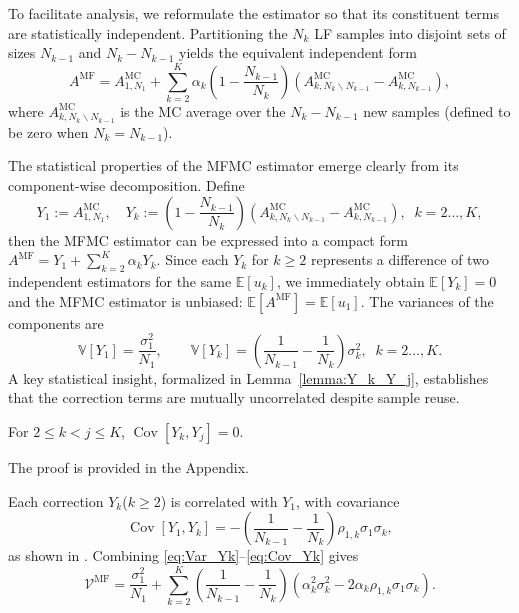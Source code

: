 To facilitate analysis, we reformulate the estimator so that its constituent terms are statistically independent. Partitioning the $N_k$ LF samples into disjoint sets of sizes $N_{k-1}$ and $N_k-N_{k-1}$ yields the equivalent independent form
%
\begin{equation}\label{eq:MFMC_estimator_independent}
    A^{\text{MF}} = A^{\text{MC}}_{1,N_1} +  \sum_{k=2}^K \alpha_k\!\left(1-\frac{N_{k-1}}{N_k}\right)\left(A^{\text{MC}}_{k,N_k\backslash N_{k-1}}-A^{\text{MC}}_{k,N_{k-1}}\right),
\end{equation}
%
where $A_{k,N_k\backslash N_{k-1}}^{\text{MC}}$ is the MC average over the $N_k-N_{k-1}$ new samples (defined to be zero when $N_k=N_{k-1}$).


The statistical properties of the MFMC estimator emerge clearly from its component-wise decomposition. Define
%
\begin{equation}\label{eq:MFMC_Yk}
Y_1 := A^{\text{MC}}_{1,N_1},\quad 
Y_k := \left(1-\frac{N_{k-1}}{N_k}\right)\!\left(A^{\text{MC}}_{k,N_k\backslash N_{k-1}} - A^{\text{MC}}_{k,N_{k-1}}\right), \;\; k=2\ldots, K,
\end{equation}
%
then the MFMC estimator can be expressed into a compact form $A^{\text{MF}} = Y_1 + \sum_{k=2}^K \alpha_k Y_k$. Since each $Y_k$ for $k\ge2$ represents a difference of two independent estimators for the same $\mathbb{E}[u_k]$, we immediately obtain $\mathbb{E}[Y_k]=0$ and the MFMC estimator is unbiased: $\mathbb{E}[A^{\text{MF}}]=\mathbb{E}[u_1]$. The variances of the components are
%
\begin{equation}\label{eq:Var_Yk}
    \mathbb{V}[Y_1] = \frac{\sigma_1^2}{N_1}, \qquad 
    \mathbb{V}[Y_k] = \left(\frac{1}{N_{k-1}} - \frac{1}{N_k}\right)\sigma_k^2, \;\; k=2\ldots, K.
\end{equation}
%
A key statistical insight, formalized in Lemma~\ref{lemma:Y_k_Y_j}, establishes that the correction terms are mutually uncorrelated despite sample reuse.
%
\begin{lemma}\label{lemma:Y_k_Y_j}
For $2\le k<j\le K$, 
$\operatorname{Cov} [Y_k,Y_j ]=0$.
\end{lemma}
%
The proof is provided in the Appendix.

Each correction $Y_k$($k\ge2$) is correlated with $Y_1$, with covariance
\begin{equation}\label{eq:Cov_Yk}
\operatorname{Cov}[Y_1,Y_k] = -\!\left(\frac{1}{N_{k-1}} - \frac{1}{N_k}\right)\rho_{1,k}\sigma_1\sigma_k,
\end{equation}
as shown in \cite[Lemma~3.2]{PeWiGu:2016}. Combining \eqref{eq:Var_Yk}–\eqref{eq:Cov_Yk} gives
%
\begin{equation}\label{eq:MFMC_variance}
    \mathcal{V}^{\text{MF}}
    =\frac{\sigma_1^2}{N_1} 
    + \sum_{k=2}^K \left(\frac{1}{N_{k-1}} - \frac{1}{N_k}\right)\!\left(\alpha_k^2\sigma_k^2 - 2\alpha_k\rho_{1,k}\sigma_1\sigma_k\right).
\end{equation}
%

